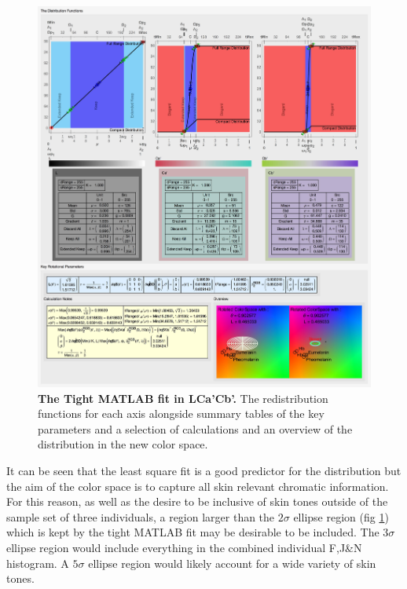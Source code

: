 \begin{figure}[h!]
  \centering
  \includegraphics[width=1.0 \textwidth]{Chapter3/Figs/Distribution_Results_Final.jpg} 
    \caption{ \textbf{The Tight MATLAB fit in LCa'Cb'.} The redistribution functions for each axis alongside summary tables of the key parameters and a selection of calculations and an overview of the distribution in the new color space.}  \label{fig:DistributionResultsFinal}
\end{figure}

It can be seen that the least square fit is a good predictor for the distribution but the aim of the color space is to capture all skin relevant chromatic information. For this reason,  as well as the desire to be inclusive of skin tones outside of the sample set of three individuals, a region larger than the $2\sigma$ ellipse region (fig \ref{fig:DistributionResultsFinal}) which is kept by the tight MATLAB fit may be desirable to be included. The $3\sigma$ ellipse region would include everything in the combined individual F,J\&N histogram. A $5\sigma$ ellipse region would  likely account for a wide variety of skin tones. 

